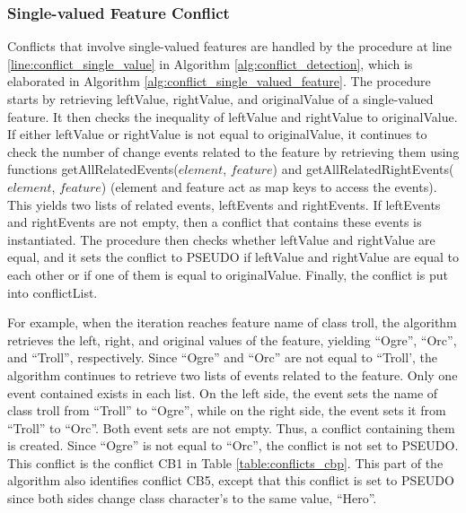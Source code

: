 \subsubsection{Single-valued Feature Conflict} 
\label{sec:single_valued_conflict}
Conflicts that involve single-valued features are handled by the procedure at line \ref{line:conflict_single_value} in Algorithm \ref{alg:conflict_detection}, which is elaborated in Algorithm \ref{alg:conflict_single_valued_feature}. The procedure starts by retrieving \textsf{leftValue}, \textsf{rightValue}, and \textsf{originalValue} of a single-valued feature. It then checks the inequality of \textsf{leftValue} and \textsf{rightValue} to \textsf{originalValue}. If either \textsf{leftValue} or \textsf{rightValue} is not equal to \textsf{originalValue}, it continues to check the number of change events related to the feature by retrieving them using functions \textsf{getAllRelatedEvents($element$, $feature$)} and \textsf{getAllRelatedRightEvents($element$, $feature$)} (element and feature act as map keys to access the events). This yields two lists of related events, \textsf{leftEvents} and \textsf{rightEvents}. If \textsf{leftEvents} and \textsf{rightEvents} are not empty, then a conflict that contains these events is instantiated. The procedure then checks whether \textsf{leftValue} and \textsf{rightValue} are equal, and it sets the conflict to \textsf{PSEUDO} if \textsf{leftValue} and \textsf{rightValue} are equal to each other or if one of them is equal to \textsf{originalValue}. Finally, the conflict is put into \textsf{conflictList}.

For example, when the iteration reaches feature \textsf{name} of class \textsf{troll}, the algorithm retrieves the left, right, and original values of the feature, yielding “Ogre”, “Orc”, and “Troll”, respectively. Since “Ogre” and “Orc” are not equal to “Troll’, the algorithm continues to retrieve two lists of events related to the feature. Only one event contained exists in each list. On the left side, the event sets the name of class \textsf{troll} from “Troll” to “Ogre”, while on the right side, the event sets it from “Troll” to “Orc”. Both event sets are not empty. Thus, a conflict containing them is created. Since “Ogre” is not equal to “Orc”, the conflict is not set to \textsf{PSEUDO}. This conflict is the conflict \textsf{CB1} in Table \ref{table:conflicts_cbp}. This part of the algorithm also identifies conflict \textsf{CB5}, except that this conflict is set to \textsf{PSEUDO} since both sides change class \textsf{character}’s  to the same value, “Hero”. 

